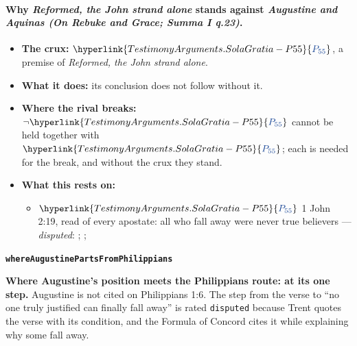 \documentclass[11pt]{article}
\newcommand{\pvar}[2]{\hyperlink{#1-P#2}{\textcolor{claimlink}{P_{#2}}}}
\begin{document}
\paragraph{Why \emph{Reformed, the John strand alone} stands against \emph{Augustine and Aquinas (On Rebuke and Grace; Summa I q.23)}.}
\begin{itemize}
\item \textbf{The crux:} \(\pvar{TestimonyArguments.SolaGratia}{55}\), a premise of \emph{Reformed, the John strand alone}.
\item \textbf{What it does:} its conclusion does not follow without it.
\item \textbf{Where the rival breaks:} \(\lnot \pvar{TestimonyArguments.SolaGratia}{55}\) cannot be held together with \(\pvar{TestimonyArguments.SolaGratia}{55}\); each is needed for the break, and without the crux they stand.
\item \textbf{What this rests on:}
\begin{itemize}
\item \(\pvar{TestimonyArguments.SolaGratia}{55}\) 1 John 2:19, read of every apostate: all who fall away were never true believers --- \emph{disputed}: \cite[594--595]{owen-works-11-perseverance}; \cite[191--192]{calvin-commentaries-catholic-epistles}; \cite[479--480]{npnf1-05-1887}
\end{itemize}
\end{itemize}
\par\medskip\noindent\textbf{\texttt{where\allowbreak{}Augustine\allowbreak{}Parts\allowbreak{}From\allowbreak{}Philippians}}\par\nobreak\noindent
\textbf{Where Augustine’s position meets the Philippians route: at its one step.} Augustine is not cited on Philippians 1:6. The step from the verse to “no one truly justified can finally fall away” is rated \texttt{disputed} because Trent quotes the verse with its condition, and the Formula of Concord cites it while explaining why some fall away.
\end{document}
